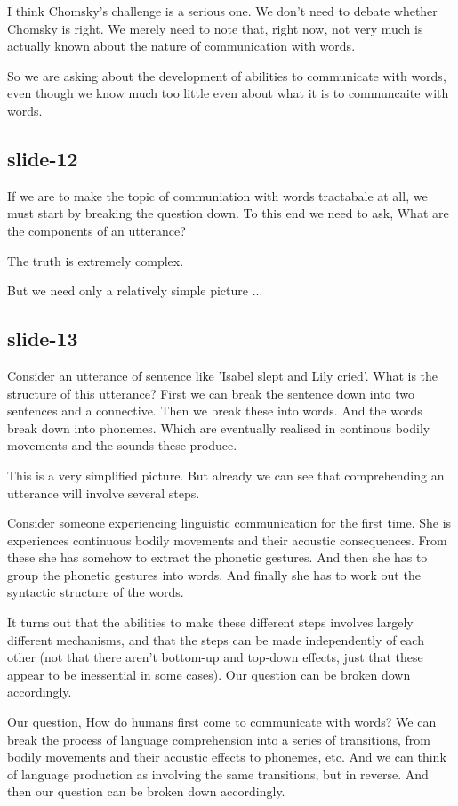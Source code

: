 \documentclass[12pt,\papersize]{extarticle}
\begin{document}
I think Chomsky’s challenge is a serious one.  We don't need to debate whether Chomsky is right.
We merely need to note that, right now, 
not very much is actually known about the nature of communication with words.
 
So we are asking about the development of abilities to communicate with words,
even though we know much too  little even about what it is to communcaite with words.
 
\subsection{slide-12}
If we are to make the topic of communiation with words tractabale at all, we must start 
by breaking the question down.
To this end we need to ask,
What are the components of an utterance?
 
The truth is extremely complex.
 
But we need only a relatively simple picture ...
 
\subsection{slide-13}
Consider an utterance of sentence like 'Isabel slept and Lily cried'.
What is the structure of this utterance?
First we can break the sentence down into two sentences and a connective.
Then we break these into words.
And the words break down into phonemes.
Which are eventually realised in continous bodily movements and the sounds these produce.
 
This is a very simplified picture.
But already we can see that comprehending an utterance will involve several steps.
 
Consider someone experiencing linguistic communication for the first time.
She is experiences continuous bodily movements and their acoustic consequences.
From these she has somehow to extract the phonetic gestures.
And then she has to group the phonetic gestures into words.
And finally she has to work out the syntactic structure of the words.
 
It turns out that the abilities to make these different steps involves largely different 
mechanisms, and that the steps can be made independently of each other (not that there aren’t 
bottom-up and top-down effects, just that these appear to be inessential in some cases).
Our question can be broken down accordingly.
 
Our question, How do humans first come to communicate with words?
We can break the process of language comprehension into a series of transitions, from bodily 
movements and their acoustic effects to phonemes, etc.
And we can think of language production as involving the same transitions, but in reverse.
And then our question can be broken down accordingly.
 
\end{document}
